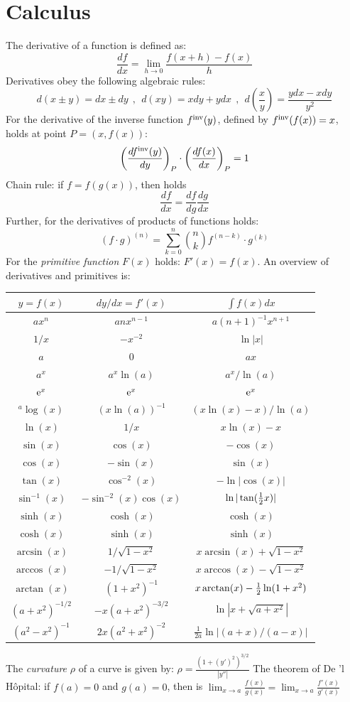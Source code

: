 \documentclass[twoside]{report}
\begin{document}
\section{Calculus}
The derivative of a function is defined as:
\[
\frac{df}{dx}=\lim_{h\rightarrow0}\frac{f(x+h)-f(x)}{h}
\]
Derivatives obey the following algebraic rules:
\[
d(x\pm y)=dx\pm dy~~,~~d(xy)=xdy+ydx~~,~~d\left(\frac{x}{y}\right)=\frac{ydx-xdy}{y^2}
\]
For the derivative of the inverse function $f^{\rm inv}(y)$, defined by
$f^{\rm inv}(f(x))=x$, holds at point $P=(x,f(x))$:
\[
\left(\frac{df^{\rm inv}(y)}{dy}\right)_P\cdot\left(\frac{df(x)}{dx}\right)_P=1
\]
Chain rule: if $f=f(g(x))$, then holds
\[
\frac{df}{dx}=\frac{df}{dg}\frac{dg}{dx}
\]
Further, for the derivatives of products of functions holds:
\[
(f\cdot g)^{(n)}=\sum\limits_{k=0}^n{n\choose k}f^{(n-k)}\cdot g^{(k)}
\]
For the {\it primitive function} $F(x)$ holds: $F'(x)=f(x)$.
An overview of derivatives and primitives is:
\begin{center}
\begin{tabular}{||c|c|c||}
\hline
\boldmath$y=f(x)$\unboldmath&\boldmath$dy/dx=f'(x)$\unboldmath&\boldmath$\int f(x)dx$\rule{0pt}{12pt}\rule[-7pt]{0pt}{0pt}\unboldmath\\
\hline
\hline
$ax^n$&$anx^{n-1}$&$a(n+1)^{-1}x^{n+1}$\rule{0pt}{12pt}\\
$1/x$&$-x^{-2}$&$\ln|x|$\\
$a$&$0$&$ax$\\
\hline
$a^x$&$a^x\ln(a)$&$a^x/\ln(a)$\rule{0pt}{12pt}\\
${\rm e}^x$&${\rm e}^x$&${\rm e}^x$\\
$^a\log(x)$&$(x\ln(a))^{-1}$&$(x\ln(x)-x)/\ln(a)$\\
$\ln(x)$&$1/x$&$x\ln(x)-x$\\
\hline
$\sin(x)$&$\cos(x)$&$-\cos(x)$\\
$\cos(x)$&$-\sin(x)$&$\sin(x)$\\
$\tan(x)$&$\cos^{-2}(x)$&$-\ln|\cos(x)|$\\
$\sin^{-1}(x)$&$-\sin^{-2}(x)\cos(x)$&$\ln|\tan(\mbox{$\frac{1}{2}$} x)|$\\
$\sinh(x)$&$\cosh(x)$&$\cosh(x)$\\
$\cosh(x)$&$\sinh(x)$&$\sinh(x)$\\
$\arcsin(x)$&$1/\sqrt{1-x^2}$&$x\arcsin(x)+\sqrt{1-x^2}$\\
$\arccos(x)$&$-1/\sqrt{1-x^2}$&$x\arccos(x)-\sqrt{1-x^2}$\\
$\arctan(x)$&$(1+x^2)^{-1}$&$x\arctan(x)-\mbox{$\frac{1}{2}$}\ln(1+x^2)$\rule[-7pt]{0pt}{0pt}\\
\hline
$(a+x^2)^{-1/2}$&$-x(a+x^2)^{-3/2}$&$\ln|x+\sqrt{a+x^2}|$\rule{0pt}{12pt}\\
$(a^2-x^2)^{-1}$&$2x(a^2+x^2)^{-2}$&$\displaystyle\frac{1}{2a}\ln|(a+x)/(a-x)|$\rule[-10pt]{0pt}{23pt}\\
\hline
\end{tabular}
\end{center}
The {\it curvature} $\rho$ of a curve is given by:
$\displaystyle\rho=\frac{(1+(y')^2)^{3/2}}{|y''|}$
\npar
The theorem of De 'l H\^opital: if $f(a)=0$ and $g(a)=0$, then is
$\displaystyle\lim_{x\rightarrow a}\frac{f(x)}{g(x)}=\lim_{x\rightarrow a}\frac{f'(x)}{g'(x)}$
\end{document}
